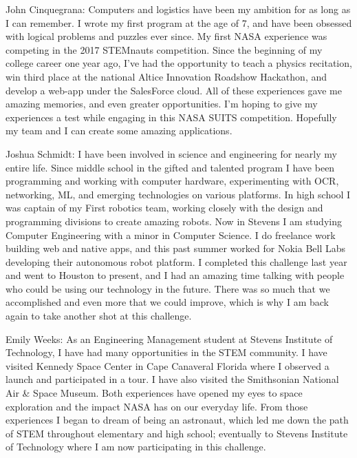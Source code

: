 \documentclass{article}
\begin{document}
John Cinquegrana: Computers and logistics have been my ambition for as long as I can remember. I wrote my first program at the age of 7, and have been obsessed with logical problems and puzzles ever since. My first NASA experience was competing in the 2017 STEMnauts competition. Since the beginning of my college career one year ago, I've had the opportunity to teach a physics recitation, win third place at the national Altice Innovation Roadshow Hackathon, and develop a web-app under the SalesForce cloud. All of these experiences gave me amazing memories, and even greater opportunities. I'm hoping to give my experiences a test while engaging in this NASA SUITS competition. Hopefully my team and I can create some amazing applications.

Joshua Schmidt: I have been involved in science and engineering for nearly my entire life. Since middle school in the gifted and talented program I have been programming and working with computer hardware, experimenting with OCR, networking, ML, and emerging technologies on various platforms. In high school I was captain of my First robotics team, working closely with the design and programming divisions to create amazing robots. Now in Stevens I am studying Computer Engineering with a minor in Computer Science. I do freelance work building web and native apps, and this past summer worked for Nokia Bell Labs developing their autonomous robot platform. I completed this challenge last year and went to Houston to present, and I had an amazing time talking with people who could be using our technology in the future. There was so much that we accomplished and even more that we could improve, which is why I am back again to take another shot at this challenge.

Emily Weeks: As an Engineering Management student at Stevens Institute of Technology, I have had many opportunities in the STEM community. I have visited Kennedy Space Center in Cape Canaveral Florida where I observed a launch and participated in a tour. I have also visited the Smithsonian National Air \& Space Museum. Both experiences have opened my eyes to space exploration and the impact NASA has on our everyday life. From those experiences I began to dream of being an astronaut, which led me down the path of STEM throughout elementary and high school; eventually to Stevens Institute of Technology where I am now participating in this challenge. 
\end{document}
